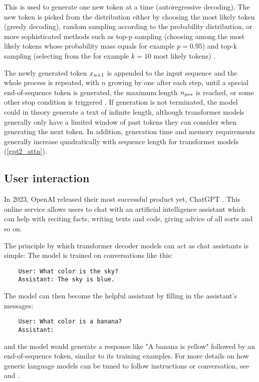 This is used to generate one new token at a time (autoregressive decoding). The new token is picked from the distribution either by choosing the most likely token (greedy decoding), random sampling according to the probability distribution, or more sophisticated methods such as top-p sampling (choosing among the most likely tokens whose probability mass equals for example $p=0.95$) and top-k sampling (selecting from the for example $k=10$ most likely tokens) \cite{ippolito2019comparison}.

The newly generated token ${x}_{n+1}$ is appended to the input sequence and the whole process is repeated, with $n$ growing by one after each step, until a special end-of-sequence token is generated, the maximum length ${n_{pos}}$ is reached, or some other stop condition is triggered \cite[sect. "Generation"]{HuggingFaceGPT2}. If generation is not terminated, the model could in theory generate a text of infinite length, although transformer models generally only have a limited window of past tokens they can consider when generating the next token. In addition, generation time and memory requirements generally increase quadratically with sequence length for transformer models (\cref{gpt2_attn}).

\subsection{User interaction}

In 2023, OpenAI released their most successful product yet, ChatGPT \cite{openai_chatgpt_2022}. This online service allows users to chat with an artificial intelligence assistant which can help with reciting facts, writing texts and code, giving advice of all sorts and so on.

The principle by which transformer decoder models can act as chat assistants is simple: The model is trained on conversations like this:

\begin{verbatim}
    User: What color is the sky?
    Assistant: The sky is blue.
\end{verbatim}

The model can then become the helpful assistant by filling in the assistant's messages:

\begin{verbatim}
    User: What color is a banana?
    Assistant:
\end{verbatim}

and the model would generate a response like "A banana is yellow" followed by an end-of-sequence token, similar to its training examples. For more details on how generic language models can be tuned to follow instructions or conversation, see \cite{yi2019coherent} and \cite{ouyang2022training}.

